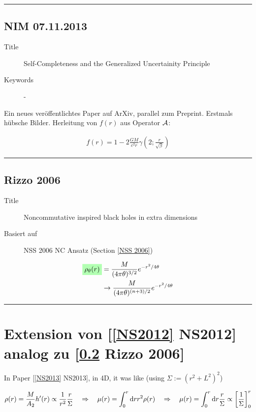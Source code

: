 \documentclass[10pt,a4paper, fleqn]{article}
\newcommand{\highlight}[1]{%
  \colorbox{green!30}{$\displaystyle#1$}}
\begin{document}
\clearpage
\rule{0.9\textwidth}{0.4pt}
\begin{multicols}{2}
\subsection{NIM 07.11.2013}
\begin{description}
  \item[Title] Self-Completeness and the Generalized Uncertainity Principle
  \item[Keywords] -
\end{description}
Ein neues veröffentlichtes Paper auf ArXiv, parallel zum Preprint. Erstmals hübsche Bilder. Herleitung von $f(r)$ aus Operator $\cal A$:

\vfill
\columnbreak
\begin{align}
f(r) = 1 - 2 \frac{G M}{c^2 r} \gamma( 2; \frac{r}{\sqrt{\beta}} )
\end{align}
\end{multicols}
\rule{0.9\textwidth}{0.4pt}
\begin{multicols}{2}
\subsection{Rizzo 2006}\label{Rizzo2006}
\begin{description}
  \item[Title] Noncommutative inspired black holes in extra dimensions
  \item[Basiert auf]  NSS 2006 NC Ansatz (Section \ref{NSS 2006})
\end{description}

\vfill
\columnbreak
\begin{align}
\highlight{ \rho_\theta(r) } &= \frac{M}{(4 \pi \theta)^{3/2}} e^{-r^2 / 4 \theta} \\
&\to \frac{M}{(4\pi\theta)^{(n+3)/2}} e^{-r^2 / 4\theta}
\end{align}

\end{multicols}
\rule{0.9\textwidth}{0.4pt}

\section{Extension von [\ref{NS2012} NS2012] analog zu [\ref{Rizzo2006} Rizzo 2006] }
In Paper [\ref{NS2013} NS2013], in 4D, it was like (using $\Sigma := (r^2+L^2)^2$)

\begin{equation}
\rho(r) = \frac{M}{A_2} h'(r)
\propto \frac{1}{r^2} \frac{r}{\Sigma}
\quad\Rightarrow\quad
\mu(r) = \int_0^r \mathrm{d} r r^2 \rho(r)
\quad\Rightarrow\quad
\mu(r) = \int_0^r \mathrm{d} r \frac{r}{\Sigma}
\propto \left[ \frac{1}{\Sigma} \right]_0^r
\end{equation}
\end{document}
